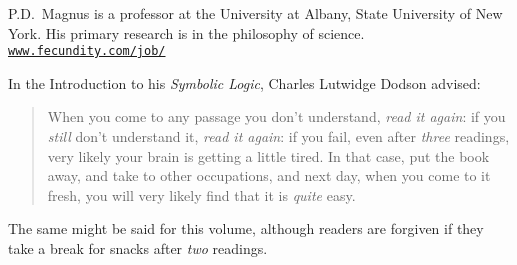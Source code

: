 P.D.\ Magnus is a professor at the University at Albany, State University of New York. His primary research is in the philosophy of science. \href{https://www.fecundity.com/job/}{\nolinkurl{www.fecundity.com/job/}}




\vfill

In the Introduction to his \emph{Symbolic Logic}, Charles Lutwidge Dodson advised: \begin{quote}
	When you come to any passage you don't understand, \emph{read it again}: if you \emph{still} don't understand it, \emph{read it again}: if you fail, even after \emph{three} readings, very likely your brain is getting a little tired. In that case, put the book away, and take to other occupations, and next day, when you come to it fresh, you will very likely find that it is \emph{quite} easy.
\end{quote}



The same might be said for this volume, although readers are forgiven if they take a break for snacks after \emph{two} readings.




